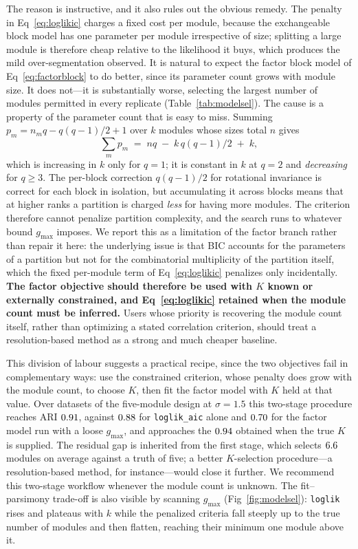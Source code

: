 The reason is instructive, and it also rules out the obvious remedy. The penalty
in Eq~\eqref{eq:loglikic} charges a fixed cost per module, because the
exchangeable block model has one parameter per module irrespective of size;
splitting a large module is therefore cheap relative to the likelihood it buys,
which produces the mild over-segmentation observed. It is natural to expect the
factor block model of Eq~\eqref{eq:factorblock} to do better, since its parameter
count grows with module size. It does not---it is substantially worse, selecting
the largest number of modules permitted in every replicate
(Table~\ref{tab:modelsel}). The cause is a property of the parameter count that
is easy to miss. Summing $p_m = n_m q - q(q-1)/2 + 1$ over $k$ modules whose
sizes total $n$ gives
\begin{equation}
\textstyle\sum_m p_m \;=\; nq \;-\; k\,q(q-1)/2 \;+\; k ,
\label{eq:factorparams}
\end{equation}
which is increasing in $k$ only for $q=1$; it is constant in $k$ at $q=2$ and
\emph{decreasing} for $q\ge3$. The per-block correction $q(q-1)/2$ for rotational
invariance is correct for each block in isolation, but accumulating it across
blocks means that at higher ranks a partition is charged \emph{less} for having
more modules. The criterion therefore cannot penalize partition complexity, and
the search runs to whatever bound $g_{\max}$ imposes. We report this as a
limitation of the factor branch rather than repair it here: the underlying issue
is that BIC accounts for the parameters of a partition but not for the
combinatorial multiplicity of the partition itself, which the fixed per-module
term of Eq~\eqref{eq:loglikic} penalizes only incidentally. \textbf{The factor
objective should therefore be used with $K$ known or externally constrained, and
Eq~\eqref{eq:loglikic} retained when the module count must be inferred.} Users
whose priority is recovering the module count itself, rather than optimizing a
stated correlation criterion, should treat a resolution-based method as a strong
and much cheaper baseline.

This division of labour suggests a practical recipe, since the two objectives
fail in complementary ways: use the constrained criterion, whose penalty does
grow with the module count, to choose $K$, then fit the factor model with $K$
held at that value. Over \TwoStageSeeds{} datasets of the five-module design at
$\sigma=1.5$ this two-stage procedure reaches ARI $0.91{}$, against
$0.88{}$ for \texttt{loglik\_aic} alone and $0.70{}$ for
the factor model run with a loose $g_{\max}$, and approaches the
$0.94{}$ obtained when the true $K$ is supplied. The residual gap is
inherited from the first stage, which selects $6.6{}$ modules on average
against a truth of five; a better $K$-selection procedure---a resolution-based
method, for instance---would close it further. We recommend this two-stage
workflow whenever the module count is unknown. The
fit--parsimony trade-off is also visible by scanning $g_{\max}$
(Fig~\ref{fig:modelsel}): \texttt{loglik} rises and plateaus with $k$ while the penalized criteria fall steeply up to the true number of modules and then flatten, reaching their minimum one module above it.

